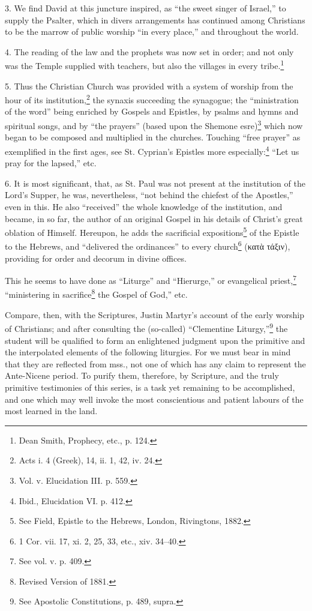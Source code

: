 3. We find David at this juncture inspired, as “the sweet singer of Israel,” to supply the Psalter, which in divers arrangements has continued among Christians to be the marrow of public worship “in every place,” and throughout the world.

4. The reading of the law and the prophets was now set in order; and not only was the Temple supplied with teachers, but also the villages in every tribe.\footnote{\par  Dean Smith, Prophecy, etc., p. 124.}

5. Thus the Christian Church was provided with a system of worship from the hour of its institution,\footnote{\par  Acts i. 4 (Greek), 14, ii. 1, 42, iv. 24.} the synaxis succeeding the synagogue; the “ministration of the word” being enriched by Gospels and Epistles, by psalms and hymns and spiritual songs, and by “the prayers” (based upon the Shemone esre)\footnote{\par  Vol. v. Elucidation III. p. 559.} which now began to be composed and multiplied in the churches. Touching “free prayer” as exemplified in the first ages, see St. Cyprian’s Epistles more especially:\footnote{\par  Ibid., Elucidation VI. p. 412.} “Let us pray for the lapsed,” etc.

6. It is most significant, that, as St. Paul was not present at the institution of the Lord’s Supper, he was, nevertheless, “not behind the chiefest of the Apostles,” even in this. He also “received” the whole knowledge of the institution, and became, in so far, the author of an original Gospel in his details of Christ’s great oblation of Himself. Hereupon, he adds the sacrificial expositions\footnote{\par  See Field, Epistle to the Hebrews, London, Rivingtons, 1882.} of the Epistle to the Hebrews, and “delivered the ordinances” to every church\footnote{\par  1 Cor. vii. 17, xi. 2, 25, 33, etc., xiv. 34–40.} (\textgreek{κατὰ τάξιν}), providing for order and decorum in divine offices.

This he seems to have done as “Liturge” and “Hierurge,” or evangelical priest,\footnote{\par  See vol. v. p. 409.} “ministering in sacrifice\footnote{\par  Revised Version of 1881.} the Gospel of God,” etc.

Compare, then, with the Scriptures, Justin Martyr’s account of the early worship of Christians; and after consulting the (so-called) “Clementine Liturgy,”\footnote{\par  See Apostolic Constitutions, p. 489, supra.} the student will be qualified to form an enlightened judgment upon the primitive and the interpolated elements of the following liturgies. For we must bear in mind that they are reflected from mss., not one of which has any claim to represent the Ante-Nicene period. To purify them, therefore, by Scripture, and the truly primitive testimonies of this series, is a task yet remaining to be accomplished, and one which may well invoke the most conscientious and patient labours of the most learned in the land.

